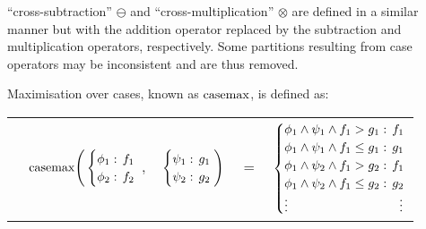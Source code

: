 ``cross-subtraction''  $\ominus$ and ``cross-multiplication'' $\otimes$
are defined in a similar manner but with the addition operator replaced
by the subtraction and multiplication operators, respectively.
Some partitions resulting from case operators may be inconsistent and 
are thus removed. 

Maximisation over cases, known as $\mathrm{casemax}$, is defined as:
\begin{center}
  \begin{tabular}{r c c c l}
  &
  \hspace{-7mm} $\mathrm{casemax} \Bigg(
    \begin{cases}
        \phi_1: \hspace{-1mm} & \hspace{-1mm} f_1 \\ 
        \phi_2: \hspace{-1mm} & \hspace{-1mm} f_2 \\ 
    \end{cases}$
  $,$
  &
  \hspace{-4mm}
    $\begin{cases}
        \psi_1: \hspace{-1mm} & \hspace{-1mm} g_1 \\ 
        \psi_2: \hspace{-1mm} & \hspace{-1mm} g_2 \\ 
    \end{cases} \Bigg)$
  &
  \hspace{-4mm} 
  $ = $
  &
  \hspace{-4mm}
    $\begin{cases}
      \phi_1 \wedge \psi_1 \wedge f_1 > g_1    : & \hspace{-2mm} f_1 \\ 
      \phi_1 \wedge \psi_1 \wedge f_1 \leq g_1 : & \hspace{-2mm} g_1 \\ 
      \phi_1 \wedge \psi_2 \wedge f_1 > g_2    : & \hspace{-2mm} f_1 \\ 
      \phi_1 \wedge \psi_2 \wedge f_1 \leq g_2 : & \hspace{-2mm} g_2 \\ 
      \vdots & \vdots
    \end{cases}$
  \end{tabular}
\end{center}

